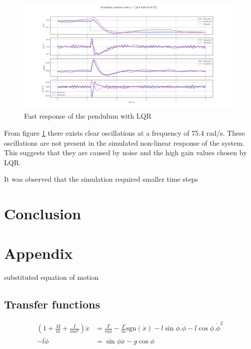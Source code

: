 \documentclass{article}
\begin{document}
\begin{figure}[H]
  \centering
  \includegraphics[width=0.99\textwidth]{figures/lqr_pendulum_fast.png}
  \caption{Fast response of the pendulum with LQR}
  \label{fig:lqr_fast}
\end{figure}

From figure \ref{fig:lqr_fast} there exists clear oscillations at a frequency of 75.4 rad/s.
These oscillations are not present in the simulated non-linear response of the system.
This suggests that they are caused by noise and the high gain values chosen by LQR.


It was observed that the simulation required smaller time steps





\section{Conclusion}


\newpage
\section{Appendix}

substituted equation of motion

\subsection{Transfer functions}

\begin{align}
  \left( 1 + \frac{M}{m} + \frac{I}{ma^2} \right) \ddot{x} &= \frac{T}{ma} - \frac{F}{m}\text{sgn}(\dot{x}) - l\sin\phi . \ddot{\phi} - l\cos\phi . \dot{\phi}^2 \\
   - l \ddot{\phi} &= \sin\phi \ddot{x} - g\cos\phi
\end{align}
\end{document}
